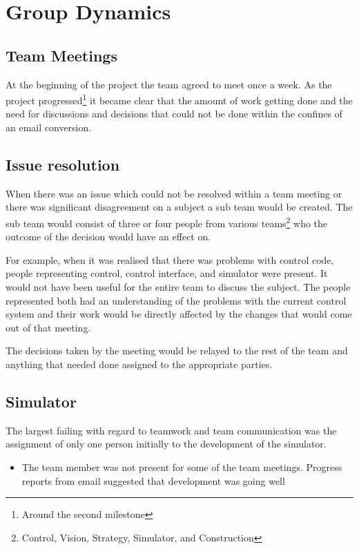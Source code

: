\section{Group Dynamics}

\subsection{Team Meetings}

At the beginning of the project the team agreed to meet once a week. As the
project progressed\footnote{Around the second milestone} it became clear that
the amount of work getting done and the need for discussions and decisions that
could not be done within the confines of an email conversion.

\subsection{Issue resolution}

When there was an issue which could not be resolved within a team meeting or
there was significant disagreement on a subject a sub team would be created.
The sub team would consist of three or four people from various
teams\footnote{Control, Vision, Strategy, Simulator, and Construction} who the
outcome of the decision would have an effect on.

For example, when it was realised that there was problems with control code,
people representing control, control interface, and simulator were present. It
would not have been useful for the entire team to discuss the subject. The
people represented both had an understanding of the problems with the current
control system and their work would be directly affected by the changes that
would come out of that meeting.

The decisions taken by the meeting would be relayed to the rest of the team and
anything that needed done assigned to the appropriate parties.

\subsection{Simulator}

The largest failing with regard to teamwork and team communication was the
assignment of only one person initially to the development of the simulator. 

\begin{itemize}
  \item The team member was not present for some of the team meetings. Progress
  reports from email suggested that development was going well
\end{itemize}


